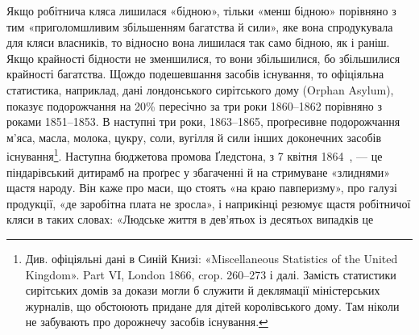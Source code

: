 Якщо робітнича кляса лишилася «бідною», тільки «менш
бідною» порівняно з тим «приголомшливим збільшенням багатства
й сили», яке вона спродукувала для кляси власників, то
відносно вона лишилася так само бідною, як і раніш. Якщо
крайності бідности не зменшилися, то вони збільшилися, бо
збільшилися крайності багатства. Щождо подешевшання засобів
існування, то офіціяльна статистика, наприклад, дані лондонського
сирітського дому (Orphan Asylum), показує подорожчання
на 20\% пересічно за три роки 1860--1862 порівняно з роками
1851--1853. В наступні три роки, 1863--1865, проґресивне
подорожчання м’яса, масла, молока, цукру, соли, вугілля й
сили інших доконечних засобів існування\footnote{
Див. офіціяльні дані в Синій Книзі: «Miscellaneous Statistics
of the United Kingdom». Part VI, London 1866, crop. 260--273 і далі.
Замість статистики сирітських домів за докази могли б служити й деклямації
міністерських журналів, що обстоюють придане для дітей королівського
дому. Там ніколи не забувають про дорожнечу засобів існування.
}. Наступна бюджетова
промова Ґледстона, з 7 квітня 1864~, — це піндарівський
дитирамб на проґрес у збагаченні й на стримуване «злиднями»
щастя народу. Він каже про маси, що стоять «на краю
павперизму», про галузі продукції, «де заробітна плата не
зросла», і наприкінці резюмує щастя робітничої кляси в таких
словах: «Людське життя в дев’ятьох із десятьох випадків це
